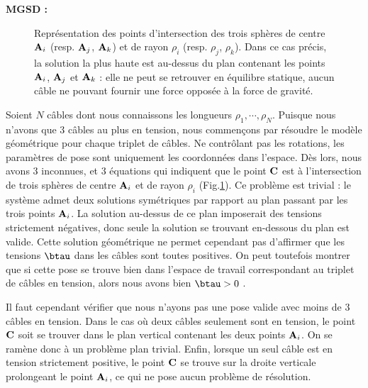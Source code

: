 {\bf MGSD :}\\

\begin{figure}[!ht]
  \centering
    \def\svgwidth{.95\linewidth}
      
    \caption{\footnotesize{Repr\'esentation des points d'intersection des 
trois sph\`eres de centre ${\bf A}_i$ (resp. ${\bf A}_j$, ${\bf A}_k$) et de 
rayon $\rho_i$ (resp. $\rho_j$, $\rho_k$). Dans ce cas pr\'ecis, la solution la 
plus haute est au-dessus du plan contenant les points ${\bf A}_i$, ${\bf 
A}_j$ et ${\bf A}_k$ : elle ne peut se retrouver en \'equilibre statique, 
aucun c\^able ne pouvant fournir une force oppos\'ee \`a la force de 
gravit\'e.}}
\label{intro:fig6b}
\end{figure}

Soient $N$ c\^ables dont nous connaissons les longueurs $\rho_1, \cdots, 
\rho_{N}$. Puisque nous n'avons que $3$ c\^ables au plus en tension, nous 
commen\c cons par r\'esoudre le mod\`ele g\'eom\'etrique pour chaque 
triplet de c\^ables. Ne contr\^olant pas les rotations, les param\`etres de 
pose sont uniquement les coordonn\'ees dans l'espace. D\`es lors, nous avons 
$3$ inconnues, et $3$ \'equations qui indiquent que le point $\bf C$ est 
à l'intersection de trois sph\`eres de centre ${\bf A}_i$ et de rayon $\rho_i$ 
(Fig.\ref{intro:fig6b}). Ce problème est trivial : le système admet deux 
solutions symétriques par rapport au plan passant par les trois points ${\bf 
A}_i$. La solution au-dessus de ce plan imposerait des tensions strictement 
négatives, donc seule la solution se trouvant en-dessous du plan est valide. 
Cette solution g\'eom\'etrique ne permet cependant pas d'affirmer que les 
tensions $\btau$ dans les c\^ables sont toutes positives. On peut toutefois 
montrer que si cette pose se trouve bien dans l'espace de travail 
correspondant au triplet de c\^ables en tension, alors nous avons bien $\btau 
> 0$ \cite{merlet2012}.

Il faut cependant v\'erifier que nous n'ayons pas une pose valide avec moins de 
$3$ c\^ables en tension. Dans le cas où deux câbles seulement sont en tension, 
le point $\bf C$ soit se trouver dans le plan vertical contenant les deux 
points ${\bf A}_i$. On se ramène donc à un problème plan trivial. Enfin, lorsque 
un seul câble est en tension strictement positive, le point ${\bf C}$ se trouve 
sur la droite verticale prolongeant le point ${\bf A}_i$, ce qui ne pose aucun 
problème de résolution.\\


